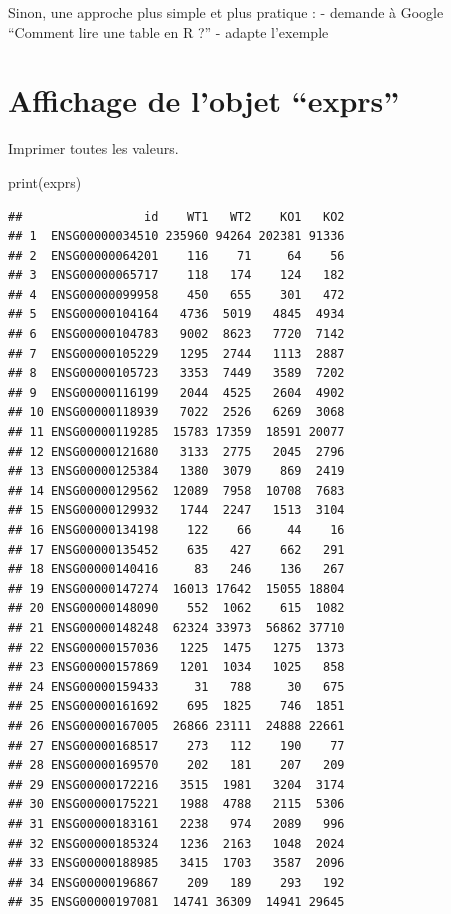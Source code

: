 \documentclass[
]{book}
\newenvironment{Shaded}{\begin{snugshade}}{\end{snugshade}}
\newcommand{\FunctionTok}[1]{\textcolor[rgb]{0.00,0.00,0.00}{#1}}
\newcommand{\NormalTok}[1]{#1}
\begin{document}
Sinon, une approche plus simple et plus pratique :
- demande à Google ``Comment lire une table en R ?''
- adapte l'exemple

\hypertarget{affichage-de-lobjet-exprs}{%
\section{Affichage de l'objet ``exprs''}\label{affichage-de-lobjet-exprs}}

Imprimer toutes les valeurs.

\begin{Shaded}
\begin{Highlighting}[]
\FunctionTok{print}\NormalTok{(exprs)}
\end{Highlighting}
\end{Shaded}

\begin{verbatim}
##                 id    WT1   WT2    KO1   KO2
## 1  ENSG00000034510 235960 94264 202381 91336
## 2  ENSG00000064201    116    71     64    56
## 3  ENSG00000065717    118   174    124   182
## 4  ENSG00000099958    450   655    301   472
## 5  ENSG00000104164   4736  5019   4845  4934
## 6  ENSG00000104783   9002  8623   7720  7142
## 7  ENSG00000105229   1295  2744   1113  2887
## 8  ENSG00000105723   3353  7449   3589  7202
## 9  ENSG00000116199   2044  4525   2604  4902
## 10 ENSG00000118939   7022  2526   6269  3068
## 11 ENSG00000119285  15783 17359  18591 20077
## 12 ENSG00000121680   3133  2775   2045  2796
## 13 ENSG00000125384   1380  3079    869  2419
## 14 ENSG00000129562  12089  7958  10708  7683
## 15 ENSG00000129932   1744  2247   1513  3104
## 16 ENSG00000134198    122    66     44    16
## 17 ENSG00000135452    635   427    662   291
## 18 ENSG00000140416     83   246    136   267
## 19 ENSG00000147274  16013 17642  15055 18804
## 20 ENSG00000148090    552  1062    615  1082
## 21 ENSG00000148248  62324 33973  56862 37710
## 22 ENSG00000157036   1225  1475   1275  1373
## 23 ENSG00000157869   1201  1034   1025   858
## 24 ENSG00000159433     31   788     30   675
## 25 ENSG00000161692    695  1825    746  1851
## 26 ENSG00000167005  26866 23111  24888 22661
## 27 ENSG00000168517    273   112    190    77
## 28 ENSG00000169570    202   181    207   209
## 29 ENSG00000172216   3515  1981   3204  3174
## 30 ENSG00000175221   1988  4788   2115  5306
## 31 ENSG00000183161   2238   974   2089   996
## 32 ENSG00000185324   1236  2163   1048  2024
## 33 ENSG00000188985   3415  1703   3587  2096
## 34 ENSG00000196867    209   189    293   192
## 35 ENSG00000197081  14741 36309  14941 29645

\end{verbatim}
\end{document}
